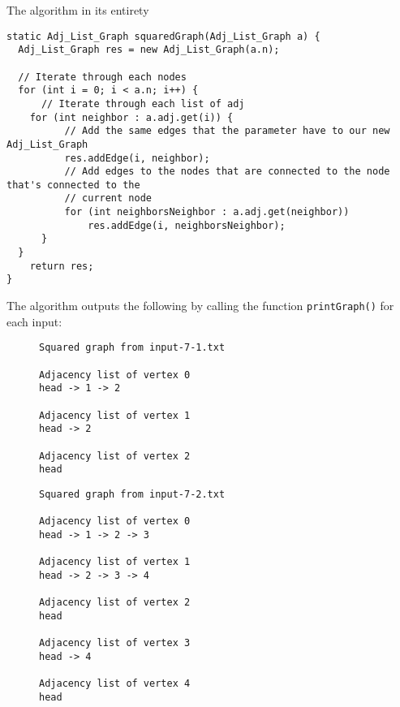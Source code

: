 \documentclass[11pt]{article}
\begin{document}
\newpage
The algorithm in its entirety
\begin{lstlisting}
static Adj_List_Graph squaredGraph(Adj_List_Graph a) {
  Adj_List_Graph res = new Adj_List_Graph(a.n);

  // Iterate through each nodes
  for (int i = 0; i < a.n; i++) {
      // Iterate through each list of adj
    for (int neighbor : a.adj.get(i)) {
          // Add the same edges that the parameter have to our new Adj_List_Graph
          res.addEdge(i, neighbor);
          // Add edges to the nodes that are connected to the node that's connected to the
          // current node
          for (int neighborsNeighbor : a.adj.get(neighbor))
              res.addEdge(i, neighborsNeighbor);
      }
  }
    return res;
}
\end{lstlisting}
The algorithm outputs the following by calling the function \verb|printGraph()| for each input:
\begin{figure}[!htbp]
	\begin{minipage}{0.5\textwidth}
		\begin{verbatim}
Squared graph from input-7-1.txt

Adjacency list of vertex 0
head -> 1 -> 2

Adjacency list of vertex 1
head -> 2

Adjacency list of vertex 2
head
    \end{verbatim}
	\end{minipage}
	\begin{minipage}{0.5\textwidth}
		\begin{verbatim}
Squared graph from input-7-2.txt

Adjacency list of vertex 0
head -> 1 -> 2 -> 3

Adjacency list of vertex 1
head -> 2 -> 3 -> 4

Adjacency list of vertex 2
head

Adjacency list of vertex 3
head -> 4

Adjacency list of vertex 4
head
    \end{verbatim}
	\end{minipage}
\end{figure}
\newpage
\end{document}
